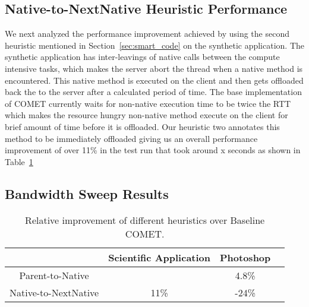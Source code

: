 \subsection{Native-to-NextNative Heuristic Performance}
We next analyzed the performance improvement achieved by using the second heuristic mentioned in Section~\ref{sec:smart_code} on the synthetic application. The synthetic application has inter-leavings of native calls between the compute intensive tasks, which makes the server abort the thread when a native method is encountered. This native method is executed on the client and then gets offloaded back the to the server after a calculated period of time. The base implementation of COMET currently waits for non-native execution time to be twice the RTT which makes the resource hungry non-native method execute on the client for brief amount of time before it is offloaded. Our heuristic two annotates this method to be immediately offloaded giving us an overall performance improvement of over 11\% in the test run that took around x seconds as shown in Table~\ref{table:heuristic}

\subsection{Bandwidth Sweep Results}


\begin{table}[tbh]
{\small
\centering
\begin{minipage}{0.45\textwidth}
\centering
\begin{tabular}{|c|c|c|c|}
\hline
& Scientific Application & Photoshop \\
\hline
\hline
Parent-to-Native &  & 4.8\% \\ \hline
\hline
Native-to-NextNative & 11\%  & -24\%  \\ \hline
 \end{tabular}
\end{minipage}
\caption{Relative improvement of different heuristics over Baseline COMET. }
\label{table:heuristic}
\vspace{-6mm}
}
\end{table}




